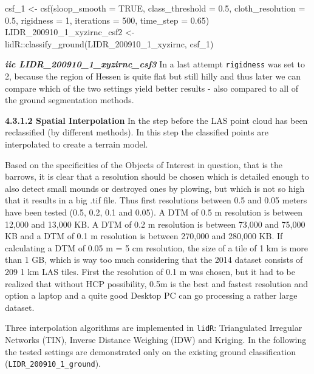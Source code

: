\documentclass[
  12pt,
]{article}
\newenvironment{Shaded}{\begin{snugshade}}{\end{snugshade}}
\newcommand{\AttributeTok}[1]{\textcolor[rgb]{0.77,0.63,0.00}{#1}}
\newcommand{\ConstantTok}[1]{\textcolor[rgb]{0.00,0.00,0.00}{#1}}
\newcommand{\DecValTok}[1]{\textcolor[rgb]{0.00,0.00,0.81}{#1}}
\newcommand{\FloatTok}[1]{\textcolor[rgb]{0.00,0.00,0.81}{#1}}
\newcommand{\FunctionTok}[1]{\textcolor[rgb]{0.00,0.00,0.00}{#1}}
\newcommand{\NormalTok}[1]{#1}
\newcommand{\OtherTok}[1]{\textcolor[rgb]{0.56,0.35,0.01}{#1}}
\newcommand{\SpecialCharTok}[1]{\textcolor[rgb]{0.00,0.00,0.00}{#1}}
\begin{document}
\begin{Shaded}
\begin{Highlighting}[]
\NormalTok{csf\_1 }\OtherTok{\textless{}{-}} \FunctionTok{csf}\NormalTok{(}\AttributeTok{sloop\_smooth =} \ConstantTok{TRUE}\NormalTok{, }\AttributeTok{class\_threshold =} \FloatTok{0.5}\NormalTok{, }\AttributeTok{cloth\_resolution =} \FloatTok{0.5}\NormalTok{,}
    \AttributeTok{rigidness =} \DecValTok{1}\NormalTok{, }\AttributeTok{iterations =} \DecValTok{500}\NormalTok{, }\AttributeTok{time\_step =} \FloatTok{0.65}\NormalTok{)}
\NormalTok{LIDR\_200910\_1\_xyzirnc\_csf2 }\OtherTok{\textless{}{-}}\NormalTok{ lidR}\SpecialCharTok{::}\FunctionTok{classify\_ground}\NormalTok{(LIDR\_200910\_1\_xyzirnc, csf\_1)}
\end{Highlighting}
\end{Shaded}

\textbf{\emph{iic LIDR\_200910\_1\_xyzirnc\_csf3}}
\newline
In a last attempt \texttt{rigidness} was set to 2, because the region of Hessen is quite flat but still hilly and thus later we can compare which of the two settings yield better results - also compared to all of the ground segmentation methods.

\textbf{4.3.1.2 Spatial Interpolation}
\newline
In the step before the LAS point cloud has been reclassified (by different methods). In this step the classified points are interpolated to create a terrain model.

Based on the specificities of the Objects of Interest in question, that is the barrows, it is clear that a resolution should be chosen which is detailed enough to also detect small mounds or destroyed ones by plowing, but which is not so high that it results in a big .tif file. Thus first resolutions between 0.5 and 0.05 meters have been tested (0.5, 0.2, 0.1 and 0.05).
A DTM of 0.5 m resolution is between 12,000 and 13,000 KB. A DTM of 0.2 m resolution is between 73,000 and 75,000 KB and a DTM of 0.1 m resolution is between 270,000 and 280,000 KB. If calculating a DTM of 0.05 m = 5 cm resolution, the size of a tile of 1 km is more than 1 GB, which is way too much considering that the 2014 dataset consists of 209 1 km LAS tiles. First the resolution of 0.1 m was chosen, but it had to be realized that without HCP possibility, 0.5m is the best and fastest resolution and option a laptop and a quite good Desktop PC can go processing a rather large dataset.

Three interpolation algorithms are implemented in \texttt{lidR}: Triangulated Irregular Networks (TIN), Inverse Distance Weighing (IDW) and Kriging. In the following the tested settings are demonstrated only on the existing ground classification (\texttt{LIDR\_200910\_1\_ground}).
\end{document}

